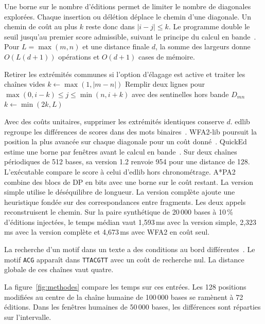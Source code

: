 
Une borne sur le nombre d'éditions permet de limiter le nombre de diagonales explorées. Chaque insertion ou délétion déplace le chemin d'une diagonale. Un chemin de coût au plus \(k\) reste donc dans \(\lvert i-j\rvert\le k\). Le programme double le seuil jusqu'au premier score admissible, suivant le principe du calcul en bande~\cite{ukkonen}. Pour \(L=\max(m,n)\) et une distance finale \(d\), la somme des largeurs donne \(O(L(d+1))\) opérations et \(O(d+1)\) cases de mémoire.
\begin{algorithmic}[1]
\State Retirer les extrémités communes si l'option d'élagage est active et traiter les chaînes vides
\State \(k\gets\max(1,|m-n|)\)
\Loop
\State Remplir deux lignes pour \(\max(0,i-k)\le j\le\min(n,i+k)\) avec des sentinelles hors bande
 \State \Return \(D_{mn}\) \EndIf
\State \(k\gets\min(2k,L)\)
\EndLoop
\end{algorithmic}
Avec des coûts unitaires, supprimer les extrémités identiques conserve \(d\). edlib regroupe les différences de scores dans des mots binaires~\cite{myers,edlib}. WFA2-lib poursuit la position la plus avancée sur chaque diagonale pour un coût donné~\cite{wfa}. QuickEd estime une borne par fenêtres avant le calcul en bande~\cite{quicked}. Sur deux chaînes périodiques de 512 bases, sa version 1.2 renvoie 954 pour une distance de 128. L'exécutable compare le score à celui d'edlib hors chronométrage.
A*PA2~\cite{astar} combine des blocs de DP en bits avec une borne sur le coût restant. La version simple utilise le déséquilibre de longueur. La version complète ajoute une heuristique fondée sur des correspondances entre fragments. Les deux appels reconstruisent le chemin. Sur la paire synthétique de 20\,000 bases à 10\,\% d'éditions injectées, le temps médian vaut 1,593\,ms avec la version simple, 2,323\,ms avec la version complète et 4,673\,ms avec WFA2 en coût seul.

La recherche d'un motif dans un texte a des conditions au bord différentes~\cite{sassy}. Le motif \texttt{ACG} apparaît dans \texttt{TTACGTT} avec un coût de recherche nul. La distance globale de ces chaînes vaut quatre.

La figure~\ref{fig:methodes} compare les temps sur ces entrées. Les 128 positions modifiées au centre de la chaîne humaine de 100\,000 bases se ramènent à 72 éditions. Dans les fenêtres humaines de 50\,000 bases, les différences sont réparties sur l'intervalle.
